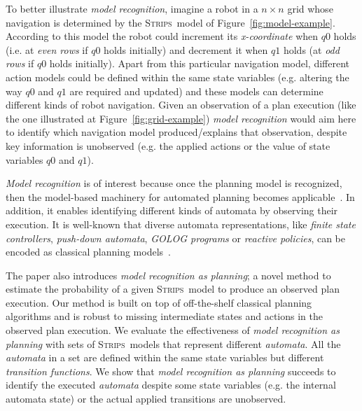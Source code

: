 \documentclass[letterpaper]{article} %
\newcommand{\strips}{\textsc{Strips}}     %
\begin{document}
To better illustrate {\em model recognition}, imagine a robot in a $n\times n$ grid whose navigation is determined by the \strips\ model of Figure~\ref{fig:model-example}. According to this model the robot could increment its {\em x-coordinate} when {\tt\small $q0$} holds (i.e. at {\em even rows} if {\tt\small $q0$} holds initially) and decrement it when {\tt\small $q1$} holds (at {\em odd rows} if {\tt\small $q0$} holds initially). Apart from this particular navigation model, different action models could be defined within the same state variables (e.g. altering the way {\tt\small $q0$} and {\tt\small $q1$} are required and updated) and these models can determine different kinds of robot navigation. Given an observation of a plan execution (like the one illustrated at Figure~\ref{fig:grid-example}) {\em model recognition} would aim here to identify which navigation model produced/explains that observation, despite key information is unobserved (e.g. the applied actions or the value of state variables {\small\tt $q0$} and {\small\tt $q1$}). 

{\em Model recognition} is of interest because once the planning model is recognized, then the model-based machinery for automated planning becomes applicable~\cite{ghallab2004automated}. In addition, it enables identifying different kinds of automata by observing their execution. It is well-known that diverse automata representations, like {\em finite state controllers}, {\em push-down automata}, {\em {\sc GOLOG} programs} or {\em reactive policies}, can be encoded as classical planning models~\cite{baier2007exploiting,Geffner:FSM:AAAI10,ivankovic2015optimal,segovia2017generating}.

The paper also introduces {\em model recognition as planning}; a novel method to estimate the probability of a given \strips\ model to produce an observed plan execution. Our method is built on top of off-the-shelf classical planning algorithms and is robust to missing intermediate states and actions in the observed plan execution. We evaluate the effectiveness of {\em model recognition as planning} with sets of \strips\ models that represent different {\em automata}. All the {\em automata} in a set are defined within the same state variables but different {\em transition functions}. We show that {\em model recognition as planning} succeeds to identify the executed {\em automata} despite some state variables (e.g. the internal automata state) or the actual applied transitions are unobserved.
\end{document}

